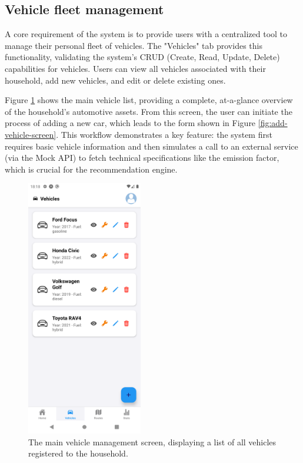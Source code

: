 \subsection{Vehicle fleet management}
A core requirement of the system is to provide users with a centralized tool to manage their personal fleet of vehicles. The "Vehicles" tab provides this functionality, validating the system's CRUD (Create, Read, Update, Delete) capabilities for vehicles. Users can view all vehicles associated with their household, add new vehicles, and edit or delete existing ones.

\textgap

Figure \ref{fig:vehicle-list-screen} shows the main vehicle list, providing a complete, at-a-glance overview of the household's automotive assets. From this screen, the user can initiate the process of adding a new car, which leads to the form shown in Figure \ref{fig:add-vehicle-screen}. This workflow demonstrates a key feature: the system first requires basic vehicle information and then simulates a call to an external service (via the Mock API) to fetch technical specifications like the emission factor, which is crucial for the recommendation engine.

\begin{figure}[H]
    \centering
    \includegraphics[width=0.45\textwidth]{images/results/vehicle_list_screen.png}
    \caption{The main vehicle management screen, displaying a list of all vehicles registered to the household.}
    \label{fig:vehicle-list-screen}
\end{figure}


